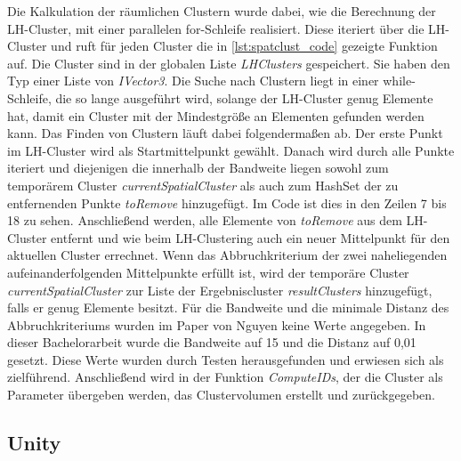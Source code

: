 Die Kalkulation der räumlichen Clustern wurde dabei, wie die Berechnung der LH-Cluster, mit einer parallelen for-Schleife realisiert. Diese iteriert über die LH-Cluster und ruft für jeden Cluster die in \autoref{lst:spatclust_code} gezeigte Funktion auf. Die Cluster sind in der globalen Liste \textit{LHClusters} gespeichert. Sie haben den Typ einer Liste von \textit{IVector3}. 
Die Suche nach Clustern liegt in einer while-Schleife, die so lange ausgeführt wird, solange der LH-Cluster genug Elemente hat, damit ein Cluster mit der Mindestgröße an Elementen gefunden werden kann. 
Das Finden von Clustern läuft dabei folgendermaßen ab. Der erste Punkt im LH-Cluster wird als Startmittelpunkt gewählt. Danach wird durch alle Punkte iteriert und diejenigen die innerhalb der Bandweite liegen sowohl zum temporärem Cluster \textit{currentSpatialCluster} als auch zum HashSet der zu entfernenden Punkte \textit{toRemove} hinzugefügt.
Im Code ist dies in den Zeilen 7 bis 18 zu sehen.
\newline
Anschließend werden, alle Elemente von \textit{toRemove} aus dem LH-Cluster entfernt und wie beim LH-Clustering auch ein neuer Mittelpunkt für den aktuellen Cluster errechnet.
Wenn das Abbruchkriterium der zwei naheliegenden aufeinanderfolgenden Mittelpunkte erfüllt ist, wird der temporäre Cluster \textit{currentSpatialCluster} zur Liste der Ergebniscluster \textit{resultClusters} hinzugefügt, falls er genug Elemente besitzt.
\newline
Für die Bandweite und die minimale Distanz des Abbruchkriteriums wurden im Paper von Nguyen \cite{nguyen2012clustering} keine Werte angegeben. In dieser Bachelorarbeit wurde die Bandweite auf 15 und die Distanz auf 0,01 gesetzt. Diese Werte wurden durch Testen herausgefunden und erwiesen sich als zielführend.
Anschließend wird in der Funktion \textit{ComputeIDs}, der die Cluster als Parameter übergeben werden, das Clustervolumen erstellt und zurückgegeben.



\subsection{Unity}

